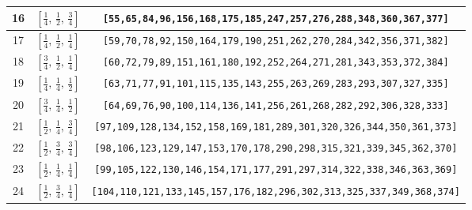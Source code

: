\documentclass[fleqn,8pt]{jsarticle}
\begin{document}
\begin{longtable}{ccc}
16 & $\left[ \frac{1}{4},\, \frac{1}{2},\, \frac{3}{4} \right]$ & {\tt [55,65,84,96,156,168,175,185,247,257,276,288,348,360,367,377]} \\ \hline
17 & $\left[ \frac{1}{4},\, \frac{1}{2},\, \frac{1}{4} \right]$ & {\tt [59,70,78,92,150,164,179,190,251,262,270,284,342,356,371,382]} \\ \hline
18 & $\left[ \frac{3}{4},\, \frac{1}{2},\, \frac{1}{4} \right]$ & {\tt [60,72,79,89,151,161,180,192,252,264,271,281,343,353,372,384]} \\ \hline
19 & $\left[ \frac{1}{4},\, \frac{1}{4},\, \frac{1}{2} \right]$ & {\tt [63,71,77,91,101,115,135,143,255,263,269,283,293,307,327,335]} \\ \hline
20 & $\left[ \frac{3}{4},\, \frac{1}{4},\, \frac{1}{2} \right]$ & {\tt [64,69,76,90,100,114,136,141,256,261,268,282,292,306,328,333]} \\ \hline
21 & $\left[ \frac{1}{2},\, \frac{1}{4},\, \frac{3}{4} \right]$ & {\tt [97,109,128,134,152,158,169,181,289,301,320,326,344,350,361,373]} \\ \hline
22 & $\left[ \frac{1}{2},\, \frac{3}{4},\, \frac{3}{4} \right]$ & {\tt [98,106,123,129,147,153,170,178,290,298,315,321,339,345,362,370]} \\ \hline
23 & $\left[ \frac{1}{2},\, \frac{1}{4},\, \frac{1}{4} \right]$ & {\tt [99,105,122,130,146,154,171,177,291,297,314,322,338,346,363,369]} \\ \hline
24 & $\left[ \frac{1}{2},\, \frac{3}{4},\, \frac{1}{4} \right]$ & {\tt [104,110,121,133,145,157,176,182,296,302,313,325,337,349,368,374]} \\
\end{longtable}
\renewcommand{\arraystretch}{1.2}
\end{document}
